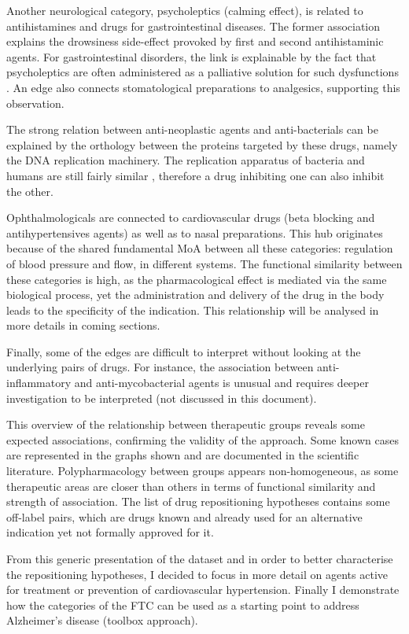 Another neurological category, psycholeptics (calming effect), is related to antihistamines and drugs for gastrointestinal diseases. The former association explains the drowsiness side-effect provoked by first and second antihistaminic agents. For gastrointestinal disorders, the link is explainable by the fact that psycholeptics are often administered as a palliative solution for such dysfunctions \citep{atca03}. An edge also connects stomatological preparations to analgesics, supporting this observation.

The strong relation between anti-neoplastic agents and anti-bacterials can be explained by the orthology between the proteins targeted by these drugs, namely the DNA replication machinery. The replication apparatus of bacteria and humans are still fairly similar \citep{hurle2013computational}, therefore a drug inhibiting one can also inhibit the other.

Ophthalmologicals are connected to cardiovascular drugs (beta blocking and antihypertensives agents) as well as to nasal preparations. This hub originates because of the shared fundamental MoA between all these categories: regulation of blood pressure and flow, in different systems. The functional similarity between these categories is high, as the pharmacological effect is mediated via the same biological process, yet the administration and delivery of the drug in the body leads to the specificity of the indication. This relationship will be analysed in more details in coming sections.

Finally, some of the edges are difficult to interpret without looking at the underlying pairs of drugs. For instance, the association between anti-inflammatory and anti-mycobacterial agents is unusual and requires deeper investigation to be interpreted (not discussed in this document).

This overview of the relationship between therapeutic groups reveals some expected associations, confirming the validity of the approach. Some known cases are represented in the graphs shown and are documented in the scientific literature. Polypharmacology between groups appears non-homogeneous, as some therapeutic areas are closer than others in terms of functional similarity and strength of association. The list of drug repositioning hypotheses contains some off-label pairs, which are drugs known and already used for an alternative indication yet not formally approved for it.

From this generic presentation of the dataset and in order to better characterise the repositioning hypotheses, I decided to focus in more detail on agents active for treatment or prevention of cardiovascular hypertension. Finally I demonstrate how the categories of the FTC can be used as a starting point to address Alzheimer's disease (toolbox approach).

